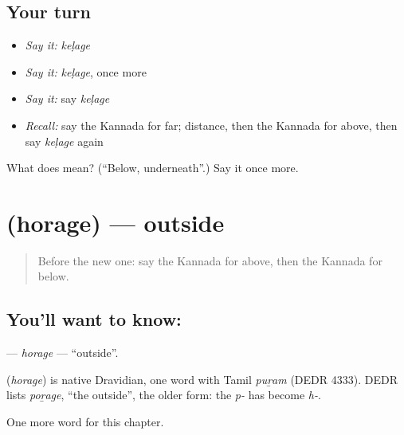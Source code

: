 \subsection*{Your turn}
\begin{itemize}
\raggedright
  \item \emph{Say it:} \emph{keḷage}
  \item \emph{Say it:} \emph{keḷage}, once more
  \item \emph{Say it:} say \emph{keḷage}
  \item \emph{Recall:} say the Kannada for far; distance, then the Kannada for above, then say \emph{keḷage} again
\end{itemize}

\begin{tcolorbox}[breakable,colback=teal!4,colframe=teal!35!black,title={Before you move on}]
What does  mean? (\textquotedblleft{}Below, underneath\textquotedblright{}.) Say it once more.
\end{tcolorbox}
\section[\texorpdfstring{\kn{ಹೊರಗೆ} (horage)}{ಹೊರಗೆ (horage)}]{ (horage) — outside}

\label{lesson:KA-C108-horage}



\begin{quote}
Before the new one: say the Kannada for above, then the Kannada for below.
\end{quote}

\subsection*{You'll want to know: }
\textbf{} — \emph{horage} — \textquotedblleft{}outside\textquotedblright{}.

\begin{cousinweb}
\textbf{} (\emph{horage}) is native Dravidian, one word with Tamil \emph{puṟam} (DEDR 4333). DEDR lists \emph{poṟage}, \textquotedblleft{}the outside\textquotedblright{}, the older form: the \emph{p-} has become \emph{h-}.
\end{cousinweb}

\begin{grammarlens}[title={What you've built}]
One more word for this chapter.
\end{grammarlens}

